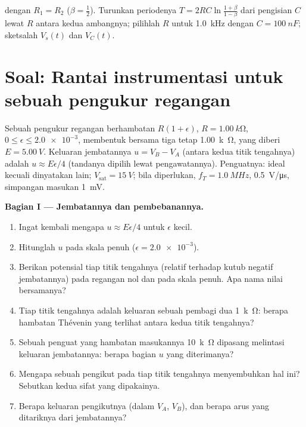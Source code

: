 \begin{exercise}[$\star\star\star$]\label{exo:b1:operational-amplifier:12}
 dengan $R_1 = R_2$ ($\beta = \tfrac12$). Turunkan
periodenya $T = 2RC\ln\frac{1 + \beta}{1 - \beta}$ dari pengisian $C$
lewat $R$ antara kedua ambangnya; pilihlah $R$ untuk \qty{1.0}{kHz}
dengan $C = \qty{100}{nF}$; sketsalah $V_s(t)$ dan $V_C(t)$.
\end{exercise}

\section{Soal: Rantai instrumentasi untuk sebuah pengukur regangan}

\begin{problem}
\label{pb:b1:operational-amplifier:1}
Sebuah pengukur regangan berhambatan $R(1 + \epsilon)$, $R = \qty{1.00}{k\ohm}$,
$0 \leq \epsilon \leq \num{2.0e-3}$, membentuk 
bersama tiga  tetap \qty{1.00}{k\ohm}, yang diberi $E = \qty{5.00}{V}$.
Keluaran jembatannya $u = V_B - V_A$ (antara kedua titik tengahnya)
adalah $u \approx E\epsilon/4$ (tandanya dipilih lewat pengawatannya).
Penguatnya: ideal kecuali dinyatakan lain; $V_{\mathrm{sat}} = \qty{15}{V}$;
bila diperlukan, $f_T = \qty{1.0}{MHz}$,  \qty{0.5}{V/\micro s},
simpangan masukan \qty{1}{mV}.

\medskip
\noindent\textbf{Bagian I --- Jembatannya dan pembebanannya.}
\begin{enumerate}
  \item Ingat kembali mengapa $u \approx E\epsilon/4$ untuk $\epsilon$ kecil.
  \item Hitunglah $u$ pada skala penuh ($\epsilon = \num{2.0e-3}$).
  \item Berikan potensial tiap titik tengahnya (relatif terhadap kutub
        negatif jembatannya) pada regangan nol dan pada skala penuh.
        Apa nama nilai bersamanya?
  \item Tiap titik tengahnya adalah keluaran sebuah pembagi dua 
        \qty{1}{k\ohm}: berapa hambatan Thévenin yang terlihat antara
        kedua titik tengahnya?
  \item Sebuah penguat yang hambatan masukannya \qty{10}{k\ohm}
        dipasang melintasi keluaran jembatannya: berapa bagian $u$ yang
        diterimanya?
  \item Mengapa sebuah pengikut pada tiap titik tengahnya menyembuhkan
        hal ini? Sebutkan kedua sifat yang dipakainya.
  \item Berapa  keluaran pengikutnya (dalam $V_A$, $V_B$), dan
        berapa arus yang ditariknya dari jembatannya?
\end{enumerate}


\end{problem}
